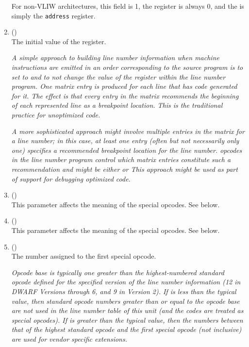 \begin{enumerate}[1. ]
For non-VLIW
architectures, this field is 1, the  register is always
0, and the  is simply the \texttt{address} register.

\item \HFNdefaultisstmt{} (\HFTubyte) \\
The initial value of the  register.  

\textit{A simple approach
to building line number information when machine instructions
are emitted in an order corresponding to the source program
is to set 
to  and to not change the
value of the  register 
within the line number program.
One matrix entry is produced for each line that has code
generated for it. The effect is that every entry in the
matrix recommends the beginning of each represented line as
a breakpoint location. This is the traditional practice for
unoptimized code.}

\textit{A more sophisticated approach might involve multiple entries in
the matrix for a line number; in this case, at least one entry
(often but not necessarily only one) specifies a recommended
breakpoint location for the line number. \DWLNSnegatestmt{}
opcodes in the line number program control which matrix entries
constitute such a recommendation and 
 might
be either  or  This approach might be
used as part of support for debugging optimized code.}

\item \HFNlinebase{} (\HFTsbyte) \\
This parameter affects the meaning of the special opcodes. See below.

\item \HFNlinerange{} (\HFTubyte) \\
This parameter affects the meaning of the special opcodes. See below.

\item \HFNopcodebase{} (\HFTubyte) \\
The number assigned to the first special opcode.

\textit{Opcode base is typically one greater than the highest-numbered
standard opcode defined for the specified version of the line
number information (12 in DWARF Versions 
 through 6,
\eb
{}
and 9 in
Version 2).  
If \HFNopcodebase{} is less than the typical value,
then standard opcode numbers greater than or equal to the
opcode base are not used in the line number table of this unit
(and the codes are treated as special opcodes). If \HFNopcodebase{}
is greater than the typical value, then the numbers between
that of the highest standard opcode and the first special
opcode (not inclusive) are used for vendor specific extensions.}


\end{enumerate}
